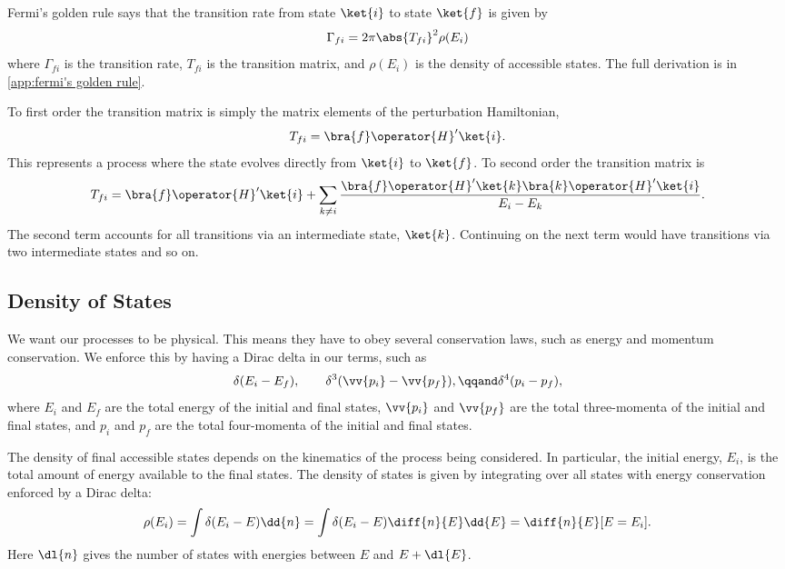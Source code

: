 \documentclass[fleqn]{NotesClass}
\begin{document}
    Fermi's golden rule says that the transition rate from state \(\ket{i}\) to state \(\ket{f}\) is given by
    \begin{equation}
        \Gamma_{fi} = 2\pi \abs{T_{fi}}^2 \rho(E_i)
    \end{equation}
    where \(\Gamma_{fi}\) is the transition rate, \(T_{fi}\) is the transition matrix, and \(\rho(E_i)\) is the density of accessible states.
    The full derivation is in \cref{app:fermi's golden rule}.
    
    To first order the transition matrix is simply the matrix elements of the perturbation Hamiltonian,
    \begin{equation}
        T_{fi} = \bra{f} \operator{H}' \ket{i}.
    \end{equation}
    This represents a process where the state evolves directly from \(\ket{i}\) to \(\ket{f}\).
    To second order the transition matrix is
    \begin{equation}
        T_{fi} = \bra{f} \operator{H}' \ket{i} + \sum_{k \ne i} \frac{\bra{f} \operator{H}' \ket{k} \bra{k} \operator{H}' \ket{i}}{E_i - E_k}.
    \end{equation}
    The second term accounts for all transitions via an intermediate state, \(\ket{k}\).
    Continuing on the next term would have transitions via two intermediate states and so on.
    
    \subsection{Density of States}
    We want our processes to be physical.
    This means they have to obey several conservation laws, such as energy and momentum conservation.
    We enforce this by having a Dirac delta in our terms, such as
    \begin{equation}
        \delta(E_i - E_f), \qquad \delta^3(\vv{p_i} - \vv{p_f}), \qqand \delta^4(p_i - p_f),
    \end{equation}
    where \(E_i\) and \(E_f\) are the total energy of the initial and final states, \(\vv{p_i}\) and \(\vv{p_f}\) are the total three-momenta of the initial and final states, and \(p_i\) and \(p_f\) are the total four-momenta of the initial and final states.
    
    The density of final accessible states depends on the kinematics of the process being considered.
    In particular, the initial energy, \(E_i\), is the total amount of energy available to the final states.
    The density of states is given by integrating over all states with energy conservation enforced by a Dirac delta:
    \begin{equation}
        \rho(E_i) = \int \delta(E_i - E) \dd{n} = \int \delta(E_i - E) \diff{n}{E} \dd{E} = \diff{n}{E}[E = E_i].
    \end{equation}
    Here \(\dl{n}\) gives the number of states with energies between \(E\) and \(E + \dl{E}\).
    
\end{document}
